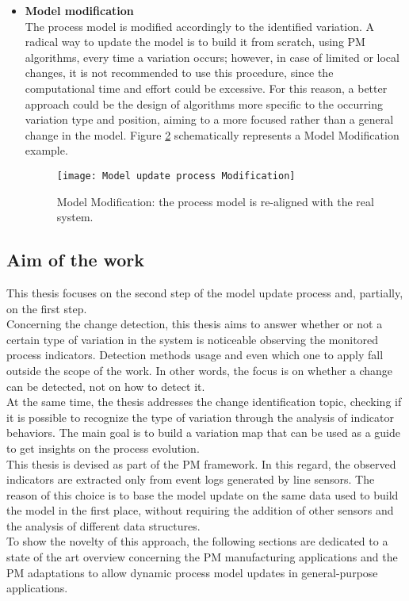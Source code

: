 \begin{itemize}
\begin{figure}[H]
\label{fig:Model update process Identification}
\end{figure}
\item \textbf{Model modification}\\The process model is modified accordingly to the identified variation. A radical way to update the model is to build it from scratch, using PM algorithms, every time a variation occurs; however, in case of limited or local changes, it is not recommended to use this procedure, since the computational time and effort could be excessive. For this reason, a better approach could be the design of algorithms more specific to the occurring variation type and position, aiming to a more focused rather than a general change in the model. Figure \ref{fig:Model update process Modification} schematically represents a Model Modification example.
\begin{figure}[H] 
\centering    
\texttt{[image: Model update process Modification]}
\caption[Model update process: Model Modification]{Model Modification: the process model is re-aligned with the real system.}
\label{fig:Model update process Modification}
\end{figure}
\end{itemize}
\subsection{Aim of the work}
\label{Aim of the work}
This thesis focuses on the second step of the model update process and, partially, on the first step. \\
Concerning the change detection, this thesis aims to answer whether or not a certain type of variation in the system is noticeable observing the monitored process indicators. Detection methods usage and even which one to apply fall outside the scope of the work. In other words, the focus is on whether a change can be detected, not on how to detect it. \\
At the same time, the thesis addresses the change identification topic, checking if it is possible to recognize the type of variation through the analysis of indicator behaviors. The main goal is to build a variation map that can be used as a guide to get insights on the process evolution. \\
This thesis is devised as part of the PM framework. In this regard, the observed indicators are extracted only from event logs generated by line sensors. The reason of this choice is to base the model update on the same data used to build the model in the first place, without requiring the addition of other sensors and the analysis of different data structures. \\
To show the novelty of this approach, the following sections are dedicated to a state of the art overview concerning the PM manufacturing applications and the PM adaptations to allow dynamic process model updates in general-purpose applications.
